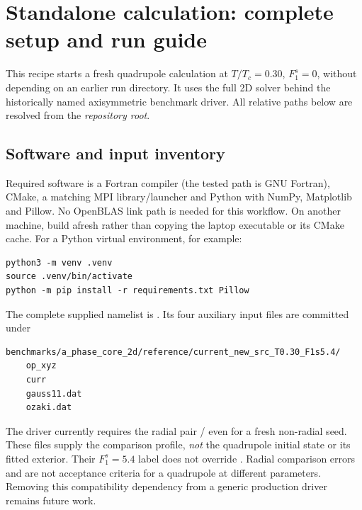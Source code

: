 \clearpage
\section{Standalone calculation: complete setup and run guide}
\label{sec:run-guide}

This recipe starts a fresh quadrupole calculation at $T/T_c=0.30$,
$F_1^s=0$, without depending on an earlier run directory. It uses the full 2D
solver behind the historically named axisymmetric benchmark driver. All
relative paths below are resolved from the \emph{repository root}.

\subsection{Software and input inventory}

Required software is a Fortran compiler (the tested path is GNU Fortran),
CMake, a matching MPI library/launcher and Python with NumPy, Matplotlib and
Pillow. No OpenBLAS link path is needed for this workflow. On another machine,
build afresh rather than copying the laptop executable or its CMake cache.
For a Python virtual environment, for example:
\begin{lstlisting}
python3 -m venv .venv
source .venv/bin/activate
python -m pip install -r requirements.txt Pillow
\end{lstlisting}

The complete supplied namelist is
. Its four auxiliary input files are
committed under
\begin{lstlisting}
benchmarks/a_phase_core_2d/reference/current_new_src_T0.30_F1s5.4/
    op_xyz
    curr
    gauss11.dat
    ozaki.dat
\end{lstlisting}
The driver currently requires the radial pair /
even for a fresh non-radial seed. These files supply the comparison profile,
\emph{not} the quadrupole initial state or its fitted exterior. Their
$F_1^s=5.4$ label does not override . Radial comparison
errors and  are not acceptance criteria for a
quadrupole at different parameters. Removing this compatibility dependency
from a generic production driver remains future work.

